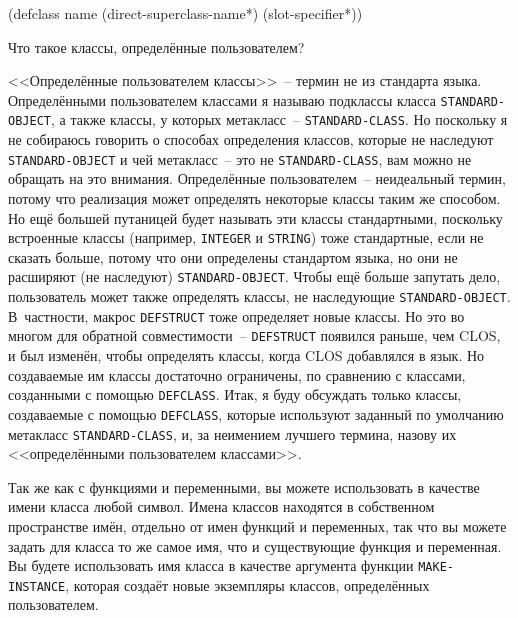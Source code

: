 \begin{myverb}
(defclass name (direct-superclass-name*)
  (slot-specifier*))
\end{myverb}

Что такое классы, определённые пользователем?

<<Определённые пользователем классы>>~-- термин не из стандарта языка. Определёнными
пользователем классами я называю подклассы класса \lstinline{STANDARD-OBJECT}, а также
классы, у которых метакласс~-- \lstinline{STANDARD-CLASS}. Но поскольку я не собираюсь
говорить о способах определения классов, которые не наследуют \lstinline{STANDARD-OBJECT}
и чей метакласс~-- это не \lstinline{STANDARD-CLASS}, вам можно не обращать на это
внимания. Определённые пользователем~-- неидеальный термин, потому что реализация может
определять некоторые классы таким же способом. Но ещё большей путаницей будет называть эти
классы стандартными, поскольку встроенные классы (например, \lstinline{INTEGER} и
\lstinline{STRING}) тоже стандартные, если не сказать больше, потому что они определены
стандартом языка, но они не расширяют (не наследуют) \lstinline{STANDARD-OBJECT}. Чтобы
ещё больше запутать дело, пользователь может также определять классы, не наследующие
\lstinline{STANDARD-OBJECT}. В~частности, макрос \lstinline{DEFSTRUCT} тоже определяет
новые классы. Но это во многом для обратной совместимости~-- \lstinline{DEFSTRUCT}
появился раньше, чем CLOS, и был изменён, чтобы определять классы, когда CLOS добавлялся в
язык. Но создаваемые им классы достаточно ограничены, по сравнению с классами, созданными с
помощью \lstinline{DEFCLASS}. Итак, я буду обсуждать только классы, создаваемые с помощью
\lstinline{DEFCLASS}, которые используют заданный по умолчанию метакласс
\lstinline{STANDARD-CLASS}, и, за неимением лучшего термина, назову их <<определёнными
пользователем классами>>.

Так же как с функциями и переменными, вы можете использовать в качестве имени класса любой
символ.  Имена классов находятся в собственном пространстве имён, отдельно от имен
функций и переменных, так что вы можете задать для класса то же самое имя, что и
существующие функция и переменная.  Вы будете использовать имя класса в качестве аргумента
функции \lstinline{MAKE-INSTANCE}, которая создаёт новые экземпляры классов, определённых
пользователем.

